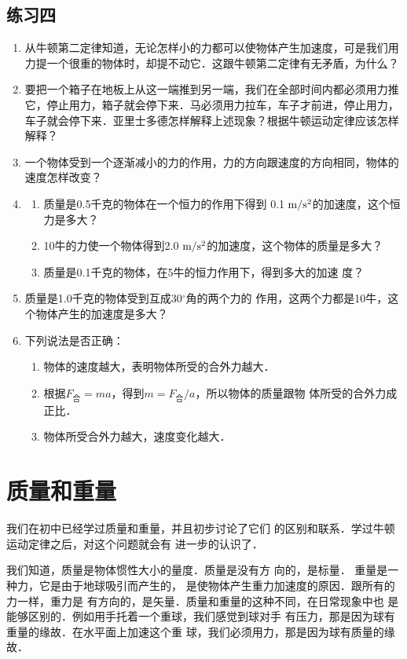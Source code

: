 \subsection*{练习四}
\begin{enumerate}
    \item 从牛顿第二定律知道，无论怎样小的力都可以使物体产生加速度，可是我们用力提一个很重的物体时，却提不动它．这跟牛顿第二定律有无矛盾，为什么？
\item 要把一个箱子在地板上从这一端推到另一端，我们在全部时间内都必须用力推它，停止用力，箱子就会停下来．马必须用力拉车，车子才前进，停止用力，车子就会停下来．亚里士多德怎样解释上述现象？根据牛顿运动定律应该怎样解释？
\item 一个物体受到一个逐渐减小的力的作用，力的方向跟速度的方向相同，物体的速度怎样改变？
\item \begin{enumerate}
\item  质量是0.5千克的物体在一个恒力的作用下得到
0.1$\;\text{m}/\text{s}^2$的加速度，这个恒力是多大？
\item 10牛的力使一个物体得到2.0$\;\text{m}/\text{s}^2$的加速度，这个物体的质量是多大？
\item 质量是0.1千克的物体，在5牛的恒力作用下，得到多大的加速
度？
\end{enumerate}
 \item 质量是1.0千克的物体受到互成30$^\circ$角的两个力的
作用，这两个力都是10牛，这个物体产生的加速度是多大？
\item 下列说法是否正确：
\begin{enumerate}
\item 物体的速度越大，表明物体所受的合外力越大．
\item 根据$F_{\text{合}}=ma$，得到$m=F_{\text{合}}/a$，所以物体的质量跟物
体所受的合外力成正比．
\item 物体所受合外力越大，速度变化越大．
\end{enumerate}


\end{enumerate}

\section{质量和重量}
我们在初中已经学过质量和重量，并且初步讨论了它们
的区别和联系．学过牛顿运动定律之后，对这个问题就会有
进一步的认识了．

我们知道，质量是物体惯性大小的量度．质量是没有方
向的，是标量．
重量是一种力，它是由于地球吸引而产生的，
是使物体产生重力加速度的原因．跟所有的力一样，重力是
有方向的，是矢量．质量和重量的这种不同，在日常现象中也
是能够区别的．例如用手托着一个重球，我们感觉到球对手
有压力，那是因为球有重量的缘故．在水平面上加速这个重
球，我们必须用力，那是因为球有质量的缘故．

